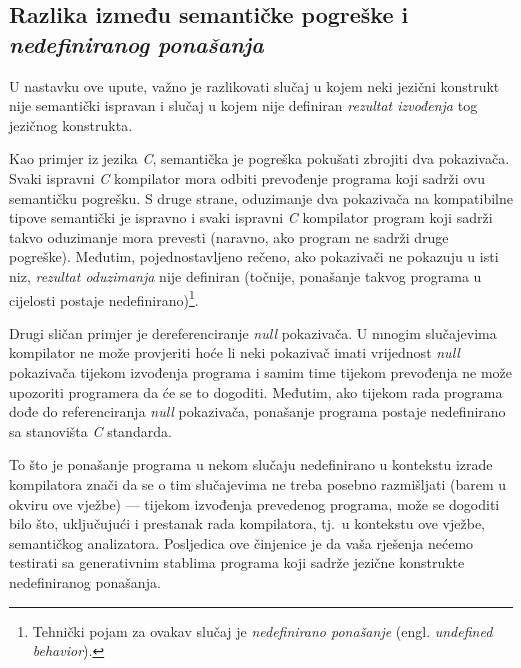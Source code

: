 \documentclass[times, 12pt, utf8]{book}
\begin{document}
\subsection{Razlika između semantičke pogreške i \emph{nedefiniranog ponašanja}}\label{sec:UB}
U nastavku ove upute, važno je razlikovati slučaj u kojem neki jezični konstrukt nije semantički ispravan i slučaj u kojem nije definiran \emph{rezultat izvođenja} tog jezičnog konstrukta. 

Kao primjer iz jezika \emph{C}, semantička je pogreška pokušati zbrojiti dva pokazivača.
Svaki ispravni \emph{C} kompilator mora odbiti prevođenje programa koji sadrži ovu semantičku pogrešku.
S druge strane, oduzimanje dva pokazivača na kompatibilne tipove semantički je ispravno i svaki ispravni \emph{C} kompilator program koji sadrži takvo oduzimanje mora prevesti (naravno, ako program ne sadrži druge pogreške).
Međutim, pojednostavljeno rečeno, ako pokazivači ne pokazuju u isti niz, \emph{rezultat oduzimanja} nije definiran (točnije, ponašanje takvog programa u cijelosti postaje nedefinirano)\footnote{Tehnički pojam za ovakav slučaj je \emph{nedefinirano ponašanje} (engl. \emph{undefined behavior}).}.

Drugi sličan primjer je dereferenciranje \emph{null} pokazivača.
U mnogim slučajevima kompilator ne može provjeriti hoće li neki pokazivač imati vrijednost \emph{null} pokazivača tijekom izvođenja programa i samim time tijekom prevođenja ne može upozoriti programera da će se to dogoditi.
Međutim, ako tijekom rada programa dođe do referenciranja \emph{null} pokazivača, ponašanje programa postaje nedefinirano sa stanovišta \emph{C} standarda.

To što je ponašanje programa u nekom slučaju nedefinirano u kontekstu izrade kompilatora znači da se o tim slučajevima ne treba posebno razmišljati (barem u okviru ove vježbe) --- tijekom izvođenja prevedenog programa, može se dogoditi bilo što, uključujući i prestanak rada kompilatora, tj.~u kontekstu ove vježbe, semantičkog analizatora.
Posljedica ove činjenice je da vaša rješenja nećemo testirati sa generativnim stablima programa koji sadrže jezične konstrukte nedefiniranog ponašanja.
\end{document}
